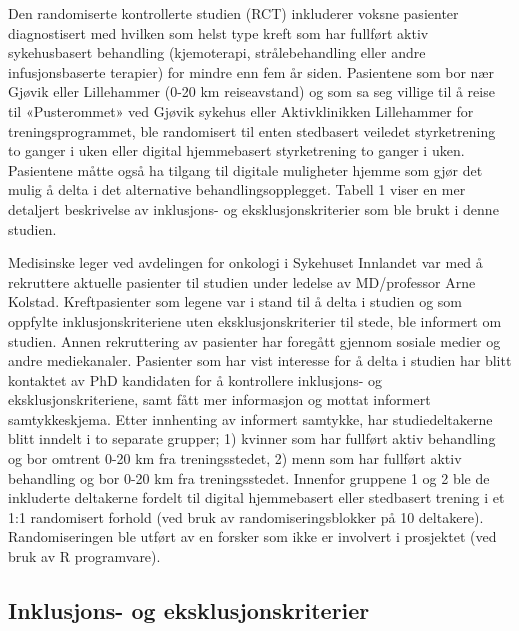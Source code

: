 \documentclass[
  letterpaper,
  DIV=11,
  numbers=noendperiod]{scrreprt}
\begin{document}
Den randomiserte kontrollerte studien (RCT) inkluderer voksne pasienter
diagnostisert med hvilken som helst type kreft som har fullført aktiv
sykehusbasert behandling (kjemoterapi, strålebehandling eller andre
infusjonsbaserte terapier) for mindre enn fem år siden. Pasientene som
bor nær Gjøvik eller Lillehammer (0-20 km reiseavstand) og som sa seg
villige til å reise til «Pusterommet» ved Gjøvik sykehus eller
Aktivklinikken Lillehammer for treningsprogrammet, ble randomisert til
enten stedbasert veiledet styrketrening to ganger i uken eller digital
hjemmebasert styrketrening to ganger i uken. Pasientene måtte også ha
tilgang til digitale muligheter hjemme som gjør det mulig å delta i det
alternative behandlingsopplegget. Tabell 1 viser en mer detaljert
beskrivelse av inklusjons- og eksklusjonskriterier som ble brukt i denne
studien.

Medisinske leger ved avdelingen for onkologi i Sykehuset Innlandet var
med å rekruttere aktuelle pasienter til studien under ledelse av
MD/professor Arne Kolstad. Kreftpasienter som legene var i stand til å
delta i studien og som oppfylte inklusjonskriteriene uten
eksklusjonskriterier til stede, ble informert om studien. Annen
rekruttering av pasienter har foregått gjennom sosiale medier og andre
mediekanaler. Pasienter som har vist interesse for å delta i studien har
blitt kontaktet av PhD kandidaten for å kontrollere inklusjons- og
eksklusjonskriteriene, samt fått mer informasjon og mottat informert
samtykkeskjema. Etter innhenting av informert samtykke, har
studiedeltakerne blitt inndelt i to separate grupper; 1) kvinner som har
fullført aktiv behandling og bor omtrent 0-20 km fra treningsstedet, 2)
menn som har fullført aktiv behandling og bor 0-20 km fra
treningsstedet. Innenfor gruppene 1 og 2 ble de inkluderte deltakerne
fordelt til digital hjemmebasert eller stedbasert trening i et 1:1
randomisert forhold (ved bruk av randomiseringsblokker på 10 deltakere).
Randomiseringen ble utført av en forsker som ikke er involvert i
prosjektet (ved bruk av R programvare).

\hypertarget{inklusjons--og-eksklusjonskriterier}{%
\subsection{Inklusjons- og
eksklusjonskriterier}\label{inklusjons--og-eksklusjonskriterier}}
\end{document}
